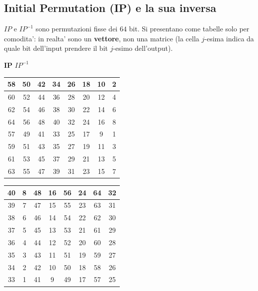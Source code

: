 \subsection{Initial Permutation (IP) e la sua inversa}
$ IP $ e $ IP^{-1} $ sono permutazioni fisse dei $ 64 $ bit. Si presentano come tabelle solo per comodita': in realta' sono un \textbf{vettore}, non una matrice (la cella $ j $-esima indica da quale bit dell'input prendere il bit $ j $-esimo dell'output).
\begin{center}
  \footnotesize
  \textbf{IP} \hspace{4em} \textbf{$IP^{-1}$}\\[2pt]
  \begin{tabular}{|c|c|c|c|c|c|c|c|}
    \hline
    58 & 50 & 42 & 34 & 26 & 18 & 10 & 2 \\ \hline
    60 & 52 & 44 & 36 & 28 & 20 & 12 & 4 \\ \hline
    62 & 54 & 46 & 38 & 30 & 22 & 14 & 6 \\ \hline
    64 & 56 & 48 & 40 & 32 & 24 & 16 & 8 \\ \hline
    57 & 49 & 41 & 33 & 25 & 17 & 9 & 1 \\ \hline
    59 & 51 & 43 & 35 & 27 & 19 & 11 & 3 \\ \hline
    61 & 53 & 45 & 37 & 29 & 21 & 13 & 5 \\ \hline
    63 & 55 & 47 & 39 & 31 & 23 & 15 & 7 \\ \hline
  \end{tabular}
  \qquad
  \begin{tabular}{|c|c|c|c|c|c|c|c|}
    \hline
    40 & 8 & 48 & 16 & 56 & 24 & 64 & 32 \\ \hline
    39 & 7 & 47 & 15 & 55 & 23 & 63 & 31 \\ \hline
    38 & 6 & 46 & 14 & 54 & 22 & 62 & 30 \\ \hline
    37 & 5 & 45 & 13 & 53 & 21 & 61 & 29 \\ \hline
    36 & 4 & 44 & 12 & 52 & 20 & 60 & 28 \\ \hline
    35 & 3 & 43 & 11 & 51 & 19 & 59 & 27 \\ \hline
    34 & 2 & 42 & 10 & 50 & 18 & 58 & 26 \\ \hline
    33 & 1 & 41 & 9 & 49 & 17 & 57 & 25 \\ \hline
  \end{tabular}
\end{center}

